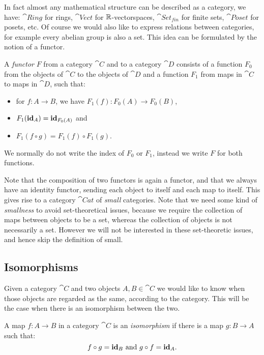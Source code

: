 In fact almost any mathematical structure can be described as a category, we have: $\cat{Ring}$ for rings, $\cat{Vect}$ for $\mathbb{R}$-vectorspaces, $\cat{Set_{fin}}$ for finite sets, $\cat{Poset}$ for posets, etc. Of course we would also like to express relations between categories, for example every abelian group is also a set. This idea can be formulated by the notion of a functor.

\begin{definition}
	A \emph{functor} $F$ from a category $\cat{C}$ and to a category $\cat{D}$ consists of a function $F_0$ from the objects of $\cat{C}$ to the objects of $\cat{D}$ and a function $F_1$ from maps in $\cat{C}$ to maps in $\cat{D}$, such that:
	\begin{itemize}
		\item for $f: A \to B$, we have $F_1(f): F_0(A) \to F_0(B)$,
		\item $F_1(\mathbf{id}_A) = \mathbf{id}_{F_0(A)}$ and
		\item $F_1(f \circ g) = F_1(f) \circ F_1(g)$.
	\end{itemize}
	We normally do not write the index of $F_0$ or $F_1$, instead we write $F$ for both functions.
\end{definition}

Note that the composition of two functors is again a functor, and that we always have an identity functor, sending each object to itself and each map to itself. This gives rise to a category $\cat{Cat}$ of \emph{small} categories. Note that we need some kind of \emph{smallness} to avoid set-theoretical issues, because we require the collection of maps between objects to be a set, whereas the collection of objects is not necessarily a set. However we will not be interested in these set-theoretic issues, and hence skip the definition of small.

\subsection{Isomorphisms}
Given a category $\cat{C}$ and two objects $A, B \in \cat{C}$ we would like to know when those objects are regarded as the same, according to the category. This will be the case when there is an isomorphism between the two.

\begin{definition}
	A map $f: A \to B$ in a category $\cat{C}$ is an \emph{isomorphism} if there is a map $g: B \to A$ such that:
	$$ f \circ g = \mathbf{id}_B \text{ and } g \circ f = \mathbf{id}_A.$$
\end{definition}

